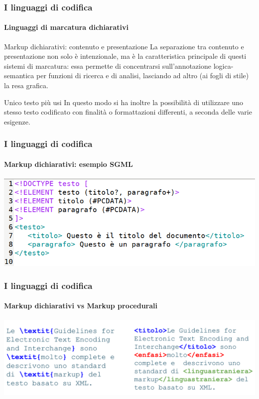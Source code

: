 \documentclass{beamer}
\begin{document}
\begin{frame}
	\frametitle{I linguaggi di codifica}
	\framesubtitle{Linguaggi di marcatura dichiarativi}
	\addtocounter{nframe}{1}

	\begin{block}{Markup dichiarativi: contenuto e presentazione}
		La separazione tra contenuto e presentazione non solo è intenzionale, ma è la caratteristica principale di questi sistemi di marcatura: essa permette di concentrarsi sull'annotazione logica-semantica per funzioni di ricerca e di analisi, lasciando ad altro (ai fogli di stile) la resa grafica.
	\end{block}

	\begin{block}{Unico testo più usi}
		In questo modo si ha inoltre la possibilità di utilizzare uno stesso testo codificato con
		finalità o formattazioni differenti, a seconda delle varie esigenze.
	\end{block}

\end{frame}

\begin{frame}
	\frametitle{I linguaggi di codifica}
	\framesubtitle{Markup dichiarativi: esempio SGML}
	\addtocounter{nframe}{1}

	\begin{center}
		\includegraphics[width=.8\textwidth]{imgs/testo-sgml.png}
	\end{center}

\end{frame}

\begin{frame}
	\frametitle{I linguaggi di codifica}
	\framesubtitle {Markup dichiarativi vs Markup procedurali}
	\addtocounter{nframe}{1}

	\begin{center}
		\includegraphics[width=.8\textwidth]{imgs/Procedurale-Dichiarativo.png}
	\end{center}

\end{frame}
\end{document}

